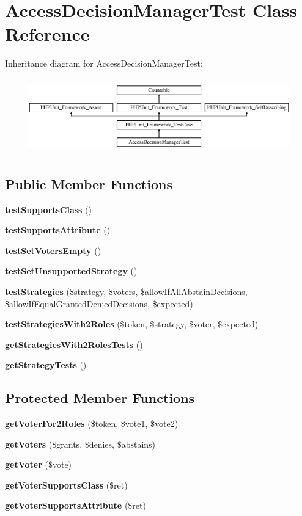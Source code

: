 \section{Access\+Decision\+Manager\+Test Class Reference}
\label{class_symfony_1_1_component_1_1_security_1_1_core_1_1_tests_1_1_authorization_1_1_access_decision_manager_test}
Inheritance diagram for Access\+Decision\+Manager\+Test\+:\begin{figure}[H]
\begin{center}
\leavevmode
\includegraphics[height=3.303835cm]{class_symfony_1_1_component_1_1_security_1_1_core_1_1_tests_1_1_authorization_1_1_access_decision_manager_test}
\end{center}
\end{figure}
\subsection*{Public Member Functions}
\begin{DoxyCompactItemize}
\item 
{\bf test\+Supports\+Class} ()
\item 
{\bf test\+Supports\+Attribute} ()
\item 
{\bf test\+Set\+Voters\+Empty} ()
\item 
{\bf test\+Set\+Unsupported\+Strategy} ()
\item 
{\bf test\+Strategies} (\$strategy, \$voters, \$allow\+If\+All\+Abstain\+Decisions, \$allow\+If\+Equal\+Granted\+Denied\+Decisions, \$expected)
\item 
{\bf test\+Strategies\+With2\+Roles} (\$token, \$strategy, \$voter, \$expected)
\item 
{\bf get\+Strategies\+With2\+Roles\+Tests} ()
\item 
{\bf get\+Strategy\+Tests} ()
\end{DoxyCompactItemize}
\subsection*{Protected Member Functions}
\begin{DoxyCompactItemize}
\item 
{\bf get\+Voter\+For2\+Roles} (\$token, \$vote1, \$vote2)
\item 
{\bf get\+Voters} (\$grants, \$denies, \$abstains)
\item 
{\bf get\+Voter} (\$vote)
\item 
{\bf get\+Voter\+Supports\+Class} (\$ret)
\item 
{\bf get\+Voter\+Supports\+Attribute} (\$ret)
\end{DoxyCompactItemize}
